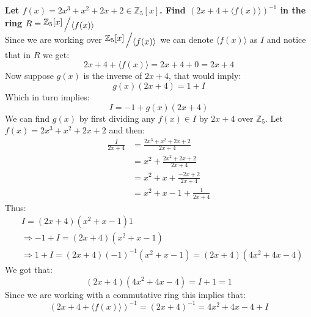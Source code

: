 \documentclass{article}
\theoremstyle{plain}
\newcommand{\Z}{\mathbb{Z}}
\newcommand{\bigslant}[2]
{{\raisebox{.2em}{$#1$}\left/\raisebox{-.2em}{$#2$}\right.}}
\begin{document}
	\textbf{
	Let $f(x)=2x^3+x^2+2x+2\in \Z_5[x]$.
	Find $(2x+4+\langle f(x)\rangle)^{-1}$ in the ring 
	$R = \bigslant{\Z_5[x]}{\langle f(x)\rangle}$} \\
	Since we are working over $\bigslant{\Z_5[x]}{\langle f(x) \rangle}$ 
	we can denote $\langle f(x) \rangle$ as $I$ and notice that in $R$ we get:
	\[
		2x + 4 + \langle f(x) \rangle = 2x + 4 + 0 = 2x + 4
	\]
	Now suppose $g(x)$ is the inverse of $2x + 4$, that would imply:
	\[
		g(x)(2x+4) = 1 + I
	\]
	Which in turn implies:
	\[
		I = -1 + g(x)(2x+4)
	\]
	We can find $g(x)$ by first dividing any $f(x)\in I$ by $2x+4$ over $\Z_5$. 
	Let $f(x) = 2x^3+x^2+2x+2$ and then:
	\begin{align*}
		\frac{I}{2x+4} &= \frac{2x^3+x^2+2x+2}{2x+4} \\ &=
		x^2 + \frac{2x^2+2x+2}{2x+4} \\ &=
		x^2 + x + \frac{-2x+2}{2x+4} \\ &=
		x^2 + x - 1 + \frac{1}{2x+4}
	\end{align*}
	Thus:
	\begin{align*}
		&I = (2x+4)(x^2+x-1) 1 \\ &\Rightarrow
		-1 + I =  (2x+4)(x^2+x-1) \\ &\Rightarrow
		 1 + I = (2x+4)(-1)^{-1}(x^2+x-1) = (2x+4)(4x^2+4x-4)
	\end{align*}
	We got that:
	\[
		(2x+4)(4x^2+4x-4) = I + 1 = 1
	\]
	Since we are working with a commutative ring this implies that:
	\[
		(2x + 4 + \langle f(x) \rangle)^{-1} = (2x + 4)^{-1} = 4x^2 + 4x - 4 + I
	\]
	
	\newpage
	
\end{document}
